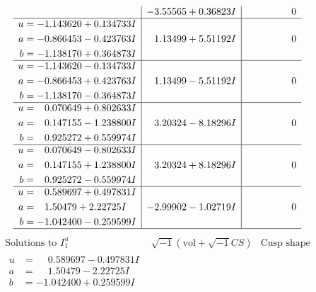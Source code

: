 \documentclass[1p]{elsarticle_modified}
\theoremstyle{definition}
\newcommand{\I}{\sqrt{-1}}
\begin{document}
$$\begin{array}{c|c|c}
 & -3.55565 + 0.36823 I & \phantom{-0.000000 } 0 \\ \hline\begin{aligned}
u &= -1.143620 + 0.134733 I \\
a &= -0.866453 - 0.423763 I \\
b &= -1.138170 + 0.364873 I\end{aligned}
 & \phantom{-}1.13499 + 5.51192 I & \phantom{-0.000000 } 0 \\ \hline\begin{aligned}
u &= -1.143620 - 0.134733 I \\
a &= -0.866453 + 0.423763 I \\
b &= -1.138170 - 0.364873 I\end{aligned}
 & \phantom{-}1.13499 - 5.51192 I & \phantom{-0.000000 } 0 \\ \hline\begin{aligned}
u &= \phantom{-}0.070649 + 0.802633 I \\
a &= \phantom{-}0.147155 - 1.238800 I \\
b &= \phantom{-}0.925272 + 0.559974 I\end{aligned}
 & \phantom{-}3.20324 - 8.18296 I & \phantom{-0.000000 } 0 \\ \hline\begin{aligned}
u &= \phantom{-}0.070649 - 0.802633 I \\
a &= \phantom{-}0.147155 + 1.238800 I \\
b &= \phantom{-}0.925272 - 0.559974 I\end{aligned}
 & \phantom{-}3.20324 + 8.18296 I & \phantom{-0.000000 } 0 \\ \hline\begin{aligned}
u &= \phantom{-}0.589697 + 0.497831 I \\
a &= \phantom{-}1.50479 + 2.22725 I \\
b &= -1.042400 - 0.259599 I\end{aligned}
 & -2.99902 - 1.02719 I & \phantom{-0.000000 } 0\\
 \hline 
 \end{array}$$\newpage$$\begin{array}{c|c|c}  
\text{Solutions to }I^u_{1}& \I (\text{vol} + \sqrt{-1}CS) & \text{Cusp shape}\\
 \hline 
\begin{aligned}
u &= \phantom{-}0.589697 - 0.497831 I \\
a &= \phantom{-}1.50479 - 2.22725 I \\
b &= -1.042400 + 0.259599 I\end{aligned}

\end{array}$$
\end{document}
